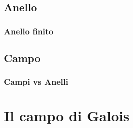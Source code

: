 \subsection{Anello}

\subsubsection{Anello finito} %

\subsection{Campo} %

\subsubsection{Campi vs Anelli} %


\section{Il campo di Galois} %





